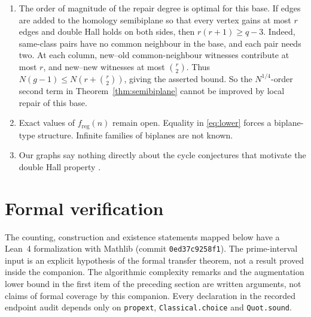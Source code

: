 \documentclass[11pt]{amsart}
\theoremstyle{definition}
\theoremstyle{remark}
\newcommand{\freg}{f_{\mathrm{reg}}}
\begin{document}
\begin{enumerate}
\item The order of magnitude of the repair degree is optimal for this base. If edges are added to the
homology semibiplane so that every vertex gains at most $r$ edges and double Hall holds on
both sides, then $r(r+1)\ge q-3$. Indeed, same-class pairs have no common neighbour in the
base, and each pair needs two. At each column, new--old common-neighbour witnesses
contribute at most $r$, and new--new witnesses at most $\binom r2$. Thus
$N(g-1)\le N(r+\binom r2)$, giving the asserted bound. So the $N^{1/4}$-order second term in
Theorem~\ref{thm:semibiplane} cannot be improved by local repair of this base.
\item Exact values of $\freg(n)$ remain open. Equality in \eqref{eq:lower} forces a
biplane-type structure. Infinite families of biplanes are not known.
\item Our graphs say nothing directly about the cycle conjectures that motivate the
double Hall property \cite{CLMSV,BGJNP}.
\end{enumerate}

\section*{Formal verification}
The counting, construction and existence statements mapped below have a Lean~4
formalization with Mathlib (commit \texttt{0ed37c9258f1}). The prime-interval input
\cite{BHP} is an explicit hypothesis of the formal transfer theorem, not a result proved
inside the companion. The algorithmic complexity remarks and the augmentation lower bound
in the first item of the preceding section are written arguments, not claims of formal
coverage by this companion. Every declaration in the recorded endpoint audit depends only
on \texttt{propext}, \texttt{Classical.choice} and \texttt{Quot.sound}.
\end{document}
